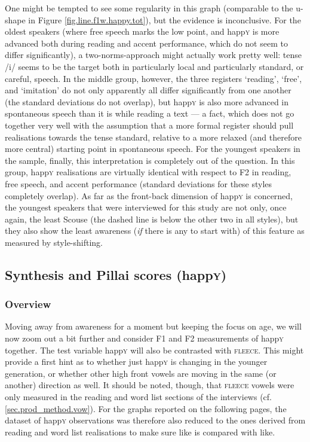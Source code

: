 One might be tempted to see some regularity in this graph (comparable to the u-shape in Figure \ref{fig.line.f1w.happy.tot}), but the evidence is inconclusive.
For the oldest speakers (where free speech marks the low point, and happ\textsc{y} is more advanced both during reading and accent performance, which do not seem to differ significantly), a two-norms-approach might actually work pretty well: tense /i/ seems to be the target both in particularly local and particularly standard, or careful, speech.
In the middle group, however, the three registers `reading', `free', and `imitation' do not only apparently all differ significantly from one another (the standard deviations do not overlap), but happ\textsc{y} is also more advanced in spontaneous speech than it is while reading a text --- a fact, which does not go together very well with the assumption that a more formal register should pull realisations towards the tense standard, relative to a more relaxed (and therefore more central) starting point in spontaneous speech.
For the youngest speakers in the sample, finally, this interpretation is completely out of the question.
In this group, happ\textsc{y} realisations are virtually identical with respect to F2 in reading, free speech, and accent performance (standard deviations for these styles completely overlap).
As far as the front-back dimension of happ\textsc{y} is concerned, the youngest speakers that were interviewed for this study are not only, once again, the least Scouse (the dashed line is below the other two in all styles), but they also show the least awareness (\emph{if} there is any to start with) of this feature as measured by style-shifting.

\subsection{Synthesis and Pillai scores (happ\textrm{\textsc{y}})}
\label{sec.prod.res.vow.happy.pil}

\subsubsection{Overview}

Moving away from awareness for a moment but keeping the focus on age, we will now zoom out a bit further and consider F1 and F2 measurements of happ\textsc{y} together.
The test variable happ\textsc{y} will also be contrasted with \textsc{fleece}.
This might provide a first hint as to whether just happ\textsc{y} is changing in the younger generation, or whether other high front vowels are moving in the same (or another) direction as well.
It should be noted, though, that \textsc{fleece} vowels were only measured in the reading and word list sections of the interviews (cf. \ref{sec.prod_method.vow}).
For the graphs reported on the following pages, the dataset of happ\textsc{y} observations was therefore also reduced to the ones derived from reading and word list realisations to make sure like is compared with like.

